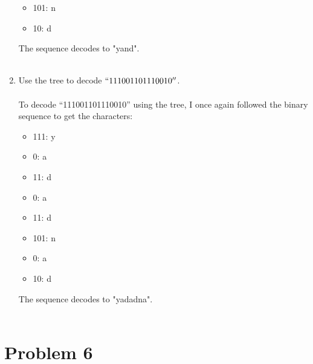 \documentclass{amsart}
\theoremstyle{definition}
\theoremstyle{Exercise}
\theoremstyle{remark}
\theoremstyle{rule}
\numberwithin{equation}{section}
\begin{document}
\begin{enumerate}[label=(\alph*)]
\begin{itemize}
    \item 101: n\\
    \item 10: d\\
\end{itemize}
    The sequence decodes to "yand".
\\\\
\item Use the tree to decode $``111001101110010''$.\\\\
    To decode ``111001101110010'' using the tree, I once again followed the binary sequence to get the characters:\\
\begin{itemize}
    \item 111: y\\
    \item 0: a\\
    \item 11: d\\
    \item 0: a\\
    \item 11: d\\
    \item 101: n\\
    \item 0: a\\
    \item 10: d\\
\end{itemize}
    The sequence decodes to "yadadna".
\\\\

\end{enumerate}

 \newpage

\section*{Problem 6}
\end{document}
